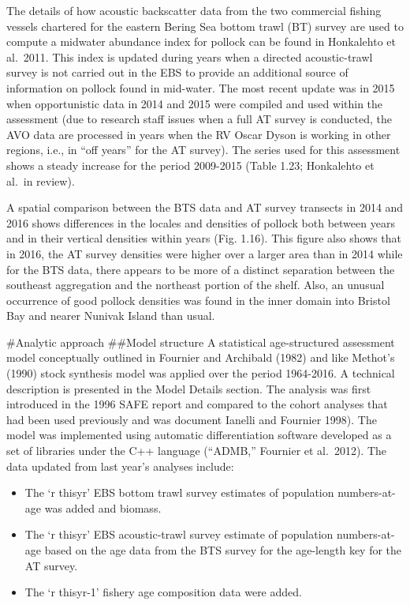The details of how acoustic backscatter data from the two commercial
fishing vessels chartered for the eastern Bering Sea bottom trawl (BT)
survey are used to compute a midwater abundance index for pollock can be
found in Honkalehto et al.~2011. This index is updated during years when
a directed acoustic-trawl survey is not carried out in the EBS to
provide an additional source of information on pollock found in
mid-water. The most recent update was in 2015 when opportunistic data in
2014 and 2015 were compiled and used within the assessment (due to
research staff issues when a full AT survey is conducted, the AVO data
are processed in years when the RV Oscar Dyson is working in other
regions, i.e., in ``off years'' for the AT survey). The series used for
this assessment shows a steady increase for the period 2009-2015 (Table
1.23; Honkalehto et al.~in review).

A spatial comparison between the BTS data and AT survey transects in
2014 and 2016 shows differences in the locales and densities of pollock
both between years and in their vertical densities within years (Fig.
1.16). This figure also shows that in 2016, the AT survey densities were
higher over a larger area than in 2014 while for the BTS data, there
appears to be more of a distinct separation between the southeast
aggregation and the northeast portion of the shelf. Also, an unusual
occurrence of good pollock densities was found in the inner domain into
Bristol Bay and nearer Nunivak Island than usual.

\#Analytic approach \#\#Model structure A statistical age-structured
assessment model conceptually outlined in Fournier and Archibald (1982)
and like Methot's (1990) stock synthesis model was applied over the
period 1964-2016. A technical description is presented in the Model
Details section. The analysis was first introduced in the 1996 SAFE
report and compared to the cohort analyses that had been used previously
and was document Ianelli and Fournier 1998). The model was implemented
using automatic differentiation software developed as a set of libraries
under the C++ language (``ADMB,'' Fournier et al.~2012). The data
updated from last year's analyses include:

\begin{itemize}
\tightlist
\item
  The `r thisyr' EBS bottom trawl survey estimates of population
  numbers-at-age was added and biomass.\\
\item
  The `r thisyr' EBS acoustic-trawl survey estimate of population
  numbers-at-age based on the age data from the BTS survey for the
  age-length key for the AT survey.\\
\item
  The `r thisyr-1' fishery age composition data were added.
\end{itemize}


